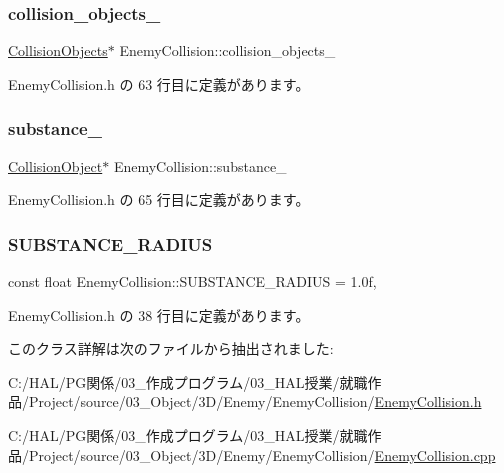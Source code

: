 \subsubsection{\texorpdfstring{collision\+\_\+objects\+\_\+}{collision\_objects\_}}
{\footnotesize\ttfamily \mbox{\hyperlink{class_collision_objects}{Collision\+Objects}}$\ast$ Enemy\+Collision\+::collision\+\_\+objects\+\_\+\hspace{0.3cm}{\ttfamily [private]}}



 Enemy\+Collision.\+h の 63 行目に定義があります。

\mbox{\label{class_enemy_collision_aa772f240ff6bb9d9cb4c6c2095b79b32}} 
\subsubsection{\texorpdfstring{substance\+\_\+}{substance\_}}
{\footnotesize\ttfamily \mbox{\hyperlink{class_collision_object}{Collision\+Object}}$\ast$ Enemy\+Collision\+::substance\+\_\+\hspace{0.3cm}{\ttfamily [private]}}



 Enemy\+Collision.\+h の 65 行目に定義があります。

\mbox{\label{class_enemy_collision_ab794511516a743fdd9d8f7b00ab6a967}} 
\subsubsection{\texorpdfstring{S\+U\+B\+S\+T\+A\+N\+C\+E\+\_\+\+R\+A\+D\+I\+US}{SUBSTANCE\_RADIUS}}
{\footnotesize\ttfamily const float Enemy\+Collision\+::\+S\+U\+B\+S\+T\+A\+N\+C\+E\+\_\+\+R\+A\+D\+I\+US = 1.\+0f\hspace{0.3cm}{\ttfamily [static]}, {\ttfamily [private]}}



 Enemy\+Collision.\+h の 38 行目に定義があります。



このクラス詳解は次のファイルから抽出されました\+:\begin{DoxyCompactItemize}
\item 
C\+:/\+H\+A\+L/\+P\+G関係/03\+\_\+作成プログラム/03\+\_\+\+H\+A\+L授業/就職作品/\+Project/source/03\+\_\+\+Object/3\+D/\+Enemy/\+Enemy\+Collision/\mbox{\hyperlink{_enemy_collision_8h}{Enemy\+Collision.\+h}}\item 
C\+:/\+H\+A\+L/\+P\+G関係/03\+\_\+作成プログラム/03\+\_\+\+H\+A\+L授業/就職作品/\+Project/source/03\+\_\+\+Object/3\+D/\+Enemy/\+Enemy\+Collision/\mbox{\hyperlink{_enemy_collision_8cpp}{Enemy\+Collision.\+cpp}}\end{DoxyCompactItemize}
